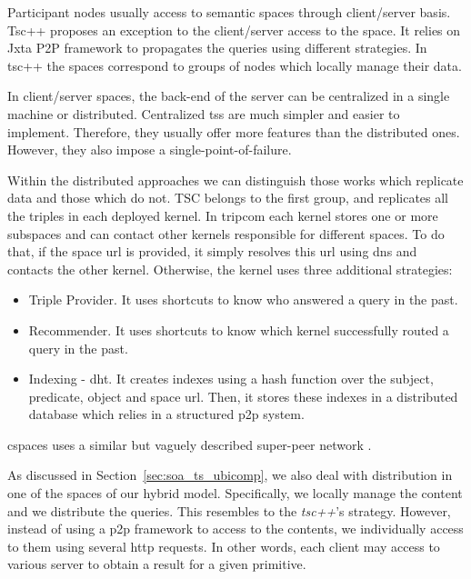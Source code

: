 Participant nodes usually access to semantic spaces through client/server basis.
Tsc++ proposes an exception to the client/server access to the space.
It relies on Jxta P2P framework to propagates the queries using different strategies.
In tsc++ the spaces correspond to groups of nodes which locally manage their data.


In client/server spaces, the back-end of the server can be centralized in a single machine or distributed.
Centralized \aclp{ts} are much simpler and easier to implement.
Therefore, they usually offer more features than the distributed ones.
However, they also impose a single-point-of-failure.


Within the distributed approaches we can distinguish those works which replicate data and those which do not.
TSC belongs to the first group, and replicates all the triples in each deployed kernel.
In \ac{tripcom} each kernel stores one or more subspaces and can contact other kernels responsible for different spaces.
To do that, if the space \ac{url} is provided, it simply resolves this \ac{url} using \ac{dns} and contacts the other kernel.
Otherwise, the kernel uses three additional strategies:
\begin{itemize}
  \item Triple Provider.
	It uses shortcuts to know who answered a query in the past.
  \item Recommender.
	It uses shortcuts to know which kernel successfully routed a query in the past.
  \item Indexing - \ac{dht}.
	It creates indexes using a hash function over the subject, predicate, object and space \ac{url}.
	Then, it stores these indexes in a distributed database which relies in a structured \ac{p2p} system. %
\end{itemize}
\ac{cspaces} uses a similar but vaguely described super-peer network \citep{martinrecuerda_application_2006}.


As discussed in Section~\ref{sec:soa_ts_ubicomp}, we also deal with distribution in one of the spaces of our hybrid model.
Specifically, we locally manage the content and we distribute the queries.
This resembles to the \emph{tsc++}'s strategy.
However, instead of using a \ac{p2p} framework to access to the contents,
we individually access to them using several \ac{http} requests. %
In other words, each client may access to various server to obtain a result for a given primitive.





